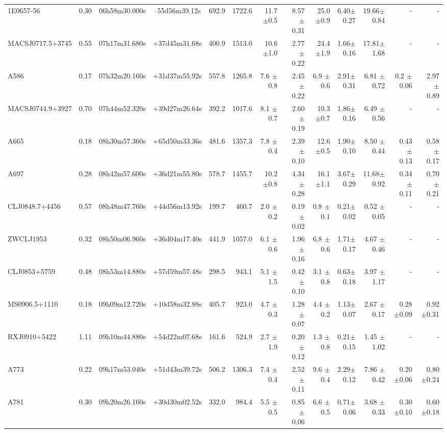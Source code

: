 \documentclass{aa}
\begin{document}
\begin{landscape}
\begin{longtable}{lcccrrrrrrrrr}
1E0657-56	 &0.30 & 06h58m30.000s &--55d56m39.12s  &  692.9   &  1722.6  &  11.7 $\pm$0.5 & 8.57 $\pm$ 0.31&25.0 $\pm$0.9  & 6.40$\pm$0.27& 19.66$\pm$0.84& - & -   \\
MACSJ0717.5+3745 &0.55 & 07h17m31.680s &+37d45m31.68s  &  400.9   &  1513.0  &  10.6 $\pm$1.0 & 2.77 $\pm$ 0.22&24.4 $\pm$1.9  & 1.66$\pm$0.16& 17.81$\pm$1.68& - & -   \\
A586	 	 &0.17 & 07h32m20.160s &+31d37m55.92s  &  557.8   &  1265.8  &  7.6  $\pm$0.8 & 2.45 $\pm$ 0.22&6.9  $\pm$0.6  & 2.91$\pm$0.31& 6.81 $\pm$0.72& 0.2 $\pm$ 0.06& 2.97 $\pm$ 0.89 \\
MACSJ0744.9+3927&0.70 & 07h44m52.320s &+39d27m26.64s  &  392.2   &  1017.6  &  8.1  $\pm$0.7 & 2.60 $\pm$ 0.19&10.3 $\pm$0.7  & 1.86$\pm$0.16& 6.49 $\pm$0.56& - & -   \\
A665		 &0.18 & 08h30m57.360s &+65d50m33.36s  &  481.6   &  1357.3  &  7.8  $\pm$0.4 & 2.39 $\pm$ 0.10&12.6 $\pm$0.5  & 1.90$\pm$0.10& 8.50 $\pm$0.44& 0.43 $\pm$ 0.13 & 0.58 $\pm$ 0.17 \\
A697		 &0.28 & 08h42m57.600s &+36d21m55.80s  &  578.7   &  1455.7  &  10.2 $\pm$0.8 & 4.34 $\pm$ 0.28&16.1 $\pm$1.1  & 3.67$\pm$0.29& 11.68$\pm$0.92& 0.34 $\pm$ 0.11 &  0.70 $\pm$ 0.21\\
CLJ0848.7+4456  &0.57 & 08h48m47.760s &+44d56m13.92s  &  199.7   &  460.7   &  2.0  $\pm$0.2 & 0.19 $\pm$ 0.02&0.8  $\pm$0.1  & 0.21$\pm$0.02& 0.52 $\pm$0.05& - & -   \\
ZWCLJ1953	 &0.32 & 08h50m06.960s &+36d04m17.40s  &  441.9   &  1057.0  &  6.1  $\pm$0.6 & 1.96 $\pm$ 0.16&6.8  $\pm$0.6  & 1.71$\pm$0.17& 4.67 $\pm$0.46& - & -   \\
CLJ0853+5759	 &0.48 & 08h53m14.880s &+57d59m57.48s  &  298.5   &  943.1   &  5.1  $\pm$1.5 & 0.42 $\pm$ 0.10&3.1  $\pm$0.8  & 0.63$\pm$0.18& 3.97 $\pm$1.17& - & -   \\
MS0906.5+1110   &0.18 & 09h09m12.720s &+10d58m32.88s  &  405.7   &  923.0   &  4.7  $\pm$0.3 & 1.28 $\pm$ 0.07&4.4  $\pm$0.2  & 1.13$\pm$0.07& 2.67 $\pm$0.17& 0.28 $\pm$0.09 & 0.92 $\pm$0.31  \\
RXJ0910+5422	 &1.11 & 09h10m44.880s &+54d22m07.68s  &  161.6   &  524.9   &  2.7  $\pm$1.9 & 0.20 $\pm$ 0.12&1.3  $\pm$0.8  & 0.21$\pm$0.15& 1.45 $\pm$1.02& - & -   \\
A773	 	 &0.22 & 09h17m53.040s &+51d43m39.72s  &  506.2   &  1306.3  &  7.4  $\pm$0.4 & 2.52 $\pm$ 0.11&9.6  $\pm$0.4  & 2.29$\pm$0.12& 7.86 $\pm$0.42& 0.20 $\pm$0.06& 0.80 $\pm$0.24  \\
A781		 &0.30 & 09h20m26.160s &+30d30m02.52s  &  332.0   &  984.4   &  5.5  $\pm$0.5 & 0.85 $\pm$ 0.06&6.6  $\pm$0.5  & 0.71$\pm$0.06& 3.68 $\pm$0.33& 0.30 $\pm$0.10 & 0.60 $\pm$0.18  \\

\end{longtable}
\end{landscape}
\end{document}
